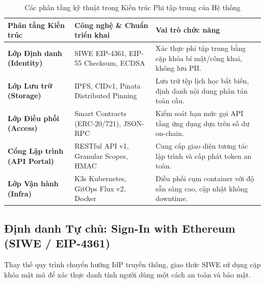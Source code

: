 \documentclass[11pt,a4paper]{article}
\begin{document}
\begin{table}[htbp]
\centering
\caption{Các phân tầng kỹ thuật trong Kiến trúc Phi tập trung của Hệ thống}
\label{tab:architecture_layers}
\small
\begin{tabularx}{\textwidth}{p{4.2cm} >{\raggedright\arraybackslash}X >{\raggedright\arraybackslash}X}
\toprule
\textbf{Phân tầng Kiến trúc} & \textbf{Công nghệ \& Chuẩn triển khai} & \textbf{Vai trò chức năng} \\
\midrule
\textbf{Lớp Định danh (Identity)} & SIWE EIP-4361, EIP-55 Checksum, ECDSA & Xác thực phi tập trung bằng cặp khóa bí mật/công khai, không lưu PII. \\
\textbf{Lớp Lưu trữ (Storage)} & IPFS, CIDv1, Pinata Distributed Pinning & Lưu trữ tệp lịch học bất biến, định danh nội dung phân tán toàn cầu. \\
\textbf{Lớp Điều phối (Access)} & Smart Contracts (ERC-20/721), JSON-RPC & Kiểm soát hạn mức gọi API tầng ứng dụng dựa trên số dư on-chain. \\
\textbf{Cổng Lập trình (API Portal)} & RESTful API v1, Granular Scopes, HMAC & Cung cấp giao diện tương tác lập trình và cấp phát token an toàn. \\
\textbf{Lớp Vận hành (Infra)} & K3s Kubernetes, GitOps Flux v2, Docker & Điều phối cụm container với độ sẵn sàng cao, cập nhật không downtime. \\
\bottomrule
\end{tabularx}
\end{table}

\subsection{Định danh Tự chủ: Sign-In with Ethereum (SIWE / EIP-4361)}
Thay thế quy trình chuyển hướng IdP truyền thống, giao thức SIWE \cite{eip4361} sử dụng cặp khóa mật mã để xác thực danh tính người dùng một cách an toàn và bảo mật.
\end{document}
